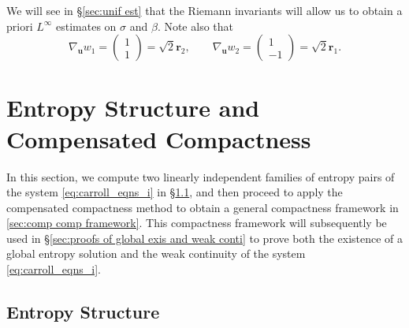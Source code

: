 \documentclass[11pt,a4paper,reqno]{amsart}
\numberwithin{equation}{section}
\theoremstyle{definition}
\theoremstyle{remark}
\newcommand{\bu}{\mathbf{u}}
\newcommand{\br}{\mathbf{r}}
\begin{document}
{We will see in \S \ref{sec:unif est} that the Riemann invariants will allow us to obtain a priori $L^\infty$ estimates on $\sigma$ and $\beta$. Note also that 
\begin{equation*}
    \nabla_\bu w_1 = \left(  \begin{matrix}
        1 \\ 1
    \end{matrix}\right) = \sqrt{2}\br_2, \qquad \nabla_\bu w_2 = \left( \begin{matrix}
        1 \\ -1
    \end{matrix} \right) = \sqrt{2}\br_1. 
\end{equation*}

\section{Entropy Structure and Compensated Compactness}\label{sec:ent struct and cc}

In this section, we compute two linearly independent families of entropy pairs of the system \eqref{eq:carroll_eqns_i} in \S \ref{sec:entropy pairs}, and then proceed to apply the compensated compactness method to obtain a general compactness framework in \ref{sec:comp comp framework}. This compactness framework will subsequently be used in \S \ref{sec:proofs of global exis and weak conti} to prove both the existence of a global entropy solution and the weak continuity of the system \eqref{eq:carroll_eqns_i}. 

\subsection{Entropy Structure}\label{sec:entropy pairs}

}
\end{document}
